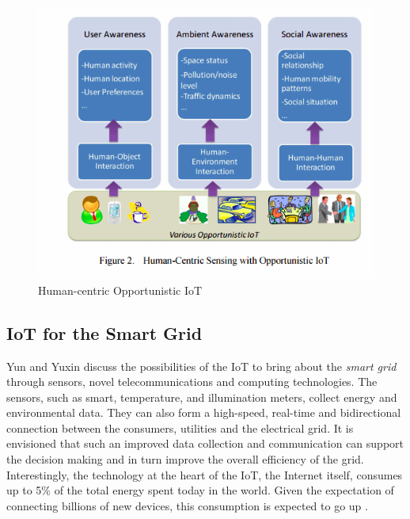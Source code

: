 \begin{figure}
	\sidecaption
	\includegraphics[scale=.55]{img/opprtunisticIoT}
	\caption{Human-centric Opportunistic IoT \cite{guo2012opportunistic}}
	\label{fig:opportunisticIoT} 
\end{figure}



\subsection{IoT for the Smart Grid}
\label{sec:IoTSG}
Yun and Yuxin \cite{yun2010research} discuss the possibilities of the IoT to bring about the \textit{smart grid} through sensors, novel telecommunications and computing technologies. The sensors, such as smart, temperature, and illumination meters, collect energy and environmental data. They can also form a high-speed, real-time and bidirectional connection between the consumers, utilities and the electrical grid. It is envisioned that such an improved data collection and communication can support the decision making and in turn improve the overall efficiency of the grid. Interestingly, the technology at the heart of the IoT, the Internet itself, consumes up to 5\% of the total energy spent today in the world. Given the expectation of connecting billions of new devices, this consumption is expected to go up \cite{gubbi2013internet}.	

